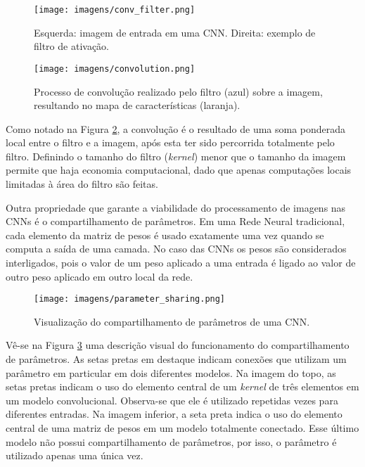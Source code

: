 \documentclass[
12pt,				%
openright,			%
oneside,			%
a4paper,			%
english,			%
french,				%
spanish,			%
brazil				%
]{abntex2}
\begin{document}
\begin{figure}[ht]
\centering
\caption{Esquerda: imagem de entrada em uma CNN. Direita: exemplo de filtro de ativação.}
\texttt{[image: imagens/conv\_filter.png]}
\label{fig:conv_filter}
\end{figure}

\begin{figure}[ht]
\centering
\caption{Processo de convolução realizado pelo filtro (azul) sobre a imagem, resultando no mapa de características (laranja).}
\texttt{[image: imagens/convolution.png]}
\label{fig:convolution}
\end{figure}

Como notado na Figura \ref{fig:convolution}, a convolução é o resultado de uma soma ponderada local entre o filtro e a imagem, após esta ter sido percorrida totalmente pelo filtro. Definindo o tamanho do filtro (\textit{kernel}) menor que o tamanho da imagem permite que haja economia computacional, dado que apenas computações locais limitadas à área do filtro são feitas.

Outra propriedade que garante a viabilidade do processamento de imagens nas CNNs é o compartilhamento de parâmetros. Em uma Rede Neural tradicional, cada elemento da matriz de pesos é usado exatamente uma vez quando se computa a saída de uma camada. No caso das CNNs os pesos são considerados interligados, pois o valor de um peso aplicado a uma entrada é ligado ao valor de outro peso aplicado em outro local da rede.

\begin{figure}[ht]
\centering
\caption{Visualização do compartilhamento de parâmetros de uma CNN.}
\texttt{[image: imagens/parameter\_sharing.png]}
\label{fig:paramater_sharing}
\end{figure}

Vê-se na Figura \ref{fig:paramater_sharing} uma descrição visual do funcionamento do compartilhamento de parâmetros. As setas pretas em destaque indicam conexões que utilizam um parâmetro em particular em dois diferentes modelos. Na imagem do topo, as setas pretas indicam o uso do elemento central de um \textit{kernel} de três elementos em um modelo convolucional. Observa-se que ele é utilizado repetidas vezes para diferentes entradas. Na imagem inferior, a seta preta indica o uso do elemento central de uma matriz de pesos em um modelo totalmente conectado. Esse último modelo não possui compartilhamento de parâmetros, por isso, o parâmetro é utilizado apenas uma única vez.
\end{document}
